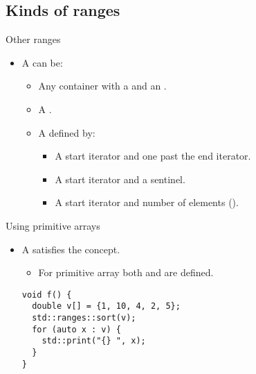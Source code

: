 \subsection{Kinds of ranges}

\begin{frame}[t,fragile]{Other ranges}
\begin{itemize}
  \item A  can be:
    \begin{itemize}
      \item Any container with a  and an .
      \item A .
      \item A  defined by:
        \begin{itemize} 
          \item A start iterator and one past the end iterator.
          \item A start iterator and a sentinel.
          \item A start iterator and number of elements ().
        \end{itemize}
    \end{itemize}
\end{itemize}
\end{frame}

\begin{frame}[t,fragile]{Using primitive arrays}
\begin{itemize}
  \item A  satisfies the 
        concept.
    \begin{itemize}
      \item For primitive array  both 
             and 
            are defined.
    \end{itemize}

\begin{lstlisting}
void f() {
  double v[] = {1, 10, 4, 2, 5};
  std::ranges::sort(v);
  for (auto x : v) {
    std::print("{} ", x);
  }
}
\end{lstlisting}
\end{itemize}
\end{frame}

